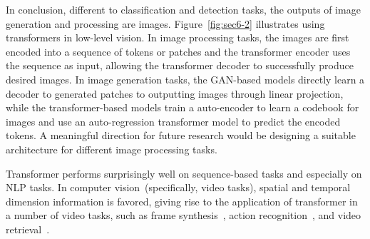 In conclusion, different to classification and detection tasks, the outputs of image generation and processing are images. Figure~\ref{fig:sec6-2} illustrates using transformers in low-level vision. In image processing tasks, the images are first encoded into a sequence of tokens or patches and the transformer encoder uses the sequence as input, allowing the transformer decoder to successfully produce desired images. In image generation tasks, the GAN-based models directly learn a decoder to generated patches to outputting images through linear projection, while the transformer-based models train a auto-encoder to learn a codebook for images and use an auto-regression transformer model to predict the encoded tokens. A meaningful direction for future research would be designing a suitable architecture for different image processing tasks.

Transformer performs surprisingly well on sequence-based tasks and especially on NLP tasks. In computer vision~(specifically, video tasks), spatial and temporal dimension information is favored, giving rise to the application of transformer in a number of video tasks, such as frame synthesis~, action recognition~, and video retrieval~.

